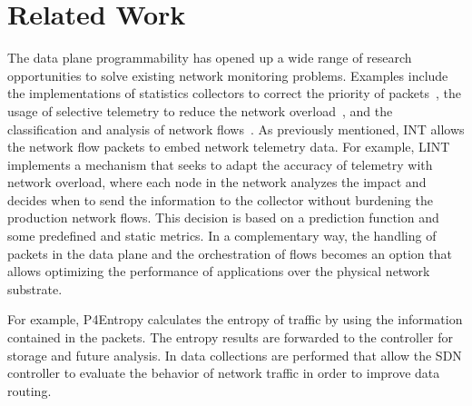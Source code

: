 \section{Related Work}


The data plane programmability has opened up a wide range of research opportunities to solve existing network monitoring problems. Examples include the implementations of statistics collectors to correct the priority of packets~\cite{tr19_p4_int_vnf}, the usage of selective telemetry to reduce the network overload~\cite{tr18_selective_in-band}, and the classification and analysis of network flows~\cite{tr19_flowstalker}. As previously mentioned, INT allows the network flow packets to embed network telemetry data. For example, LINT~\cite{tr21_lint} implements a mechanism that seeks to adapt the accuracy of telemetry with network overload, where each node in the network analyzes the impact and decides when to send the information to the collector without burdening the production network flows. This decision is based on a prediction function and some predefined and static metrics. In a complementary way, the handling of packets in the data plane and the orchestration of flows becomes an option that allows optimizing the performance of applications over the physical network substrate.


For example, P4Entropy \cite{tr20_estimating_log} calculates the entropy of traffic by using the information contained in the packets. The entropy results are forwarded to the controller for storage and future analysis. In \cite{tr21_network_telemetry_by} data collections are performed that allow the SDN controller to evaluate the behavior of network traffic in order to improve data routing. 





